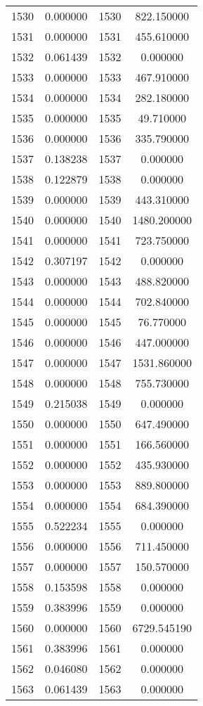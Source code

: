 \documentclass[12pt]{article}
\begin{document}
\begin{longtable}{@{}cccc@{}}
1530 & 0.000000 & 1530 & 822.150000 \\
1531 & 0.000000 & 1531 & 455.610000 \\
1532 & 0.061439 & 1532 & 0.000000 \\
1533 & 0.000000 & 1533 & 467.910000 \\
1534 & 0.000000 & 1534 & 282.180000 \\
1535 & 0.000000 & 1535 & 49.710000 \\
1536 & 0.000000 & 1536 & 335.790000 \\
1537 & 0.138238 & 1537 & 0.000000 \\
1538 & 0.122879 & 1538 & 0.000000 \\
1539 & 0.000000 & 1539 & 443.310000 \\
1540 & 0.000000 & 1540 & 1480.200000 \\
1541 & 0.000000 & 1541 & 723.750000 \\
1542 & 0.307197 & 1542 & 0.000000 \\
1543 & 0.000000 & 1543 & 488.820000 \\
1544 & 0.000000 & 1544 & 702.840000 \\
1545 & 0.000000 & 1545 & 76.770000 \\
1546 & 0.000000 & 1546 & 447.000000 \\
1547 & 0.000000 & 1547 & 1531.860000 \\
1548 & 0.000000 & 1548 & 755.730000 \\
1549 & 0.215038 & 1549 & 0.000000 \\
1550 & 0.000000 & 1550 & 647.490000 \\
1551 & 0.000000 & 1551 & 166.560000 \\
1552 & 0.000000 & 1552 & 435.930000 \\
1553 & 0.000000 & 1553 & 889.800000 \\
1554 & 0.000000 & 1554 & 684.390000 \\
1555 & 0.522234 & 1555 & 0.000000 \\
1556 & 0.000000 & 1556 & 711.450000 \\
1557 & 0.000000 & 1557 & 150.570000 \\
1558 & 0.153598 & 1558 & 0.000000 \\
1559 & 0.383996 & 1559 & 0.000000 \\
1560 & 0.000000 & 1560 & 6729.545190 \\
1561 & 0.383996 & 1561 & 0.000000 \\
1562 & 0.046080 & 1562 & 0.000000 \\
1563 & 0.061439 & 1563 & 0.000000 \\

\end{longtable}
\end{document}
